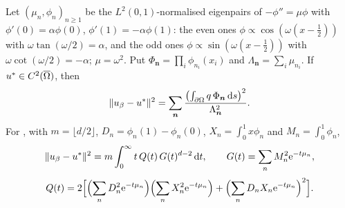 \begin{proposition}\label{sA_proofs:prop:exact}
Let $(\mu_n,\phi_n)_{n\ge1}$ be the $L^2(0,1)$-normalised eigenpairs of $-\phi''=\mu\phi$ with
$\phi'(0)=\alpha\phi(0)$, $\phi'(1)=-\alpha\phi(1)$: the even ones
$\phi\propto\cos(\omega(x-\frac12))$ with $\omega\tan(\omega/2)=\alpha$, and the odd ones
$\phi\propto\sin(\omega(x-\frac12))$ with $\omega\cot(\omega/2)=-\alpha$; $\mu=\omega^2$. Put
$\Phi_{\boldsymbol n}=\prod_i\phi_{n_i}(x_i)$ and $\Lambda_{\boldsymbol n}=\sum_i\mu_{n_i}$. If
$u^{*}\in C^2(\overline{\Omega})$, then
\[
\lVert u_{\beta}-u^{*}\rVert^2=\sum_{\boldsymbol n}\frac{\bigl(\int_{\partial\Omega}q\,\Phi_{\boldsymbol n}\,\mathrm{d} s\bigr)^2}{\Lambda_{\boldsymbol n}^2}.
\]
For \Pone, with $m=\lfloor d/2\rfloor$, $D_n=\phi_n(1)-\phi_n(0)$, $X_n=\int_0^1x\phi_n$ and
$M_n=\int_0^1\phi_n$,
\[
\lVert u_{\beta}-u^{*}\rVert^2=m\int_0^\infty t\,Q(t)\,G(t)^{d-2}\,\mathrm{d} t,\qquad G(t)=\sum_nM_n^2\mathrm{e}^{-t\mu_n},
\]
\[
Q(t)=2\Bigl[\Bigl(\sum_nD_n^2\mathrm{e}^{-t\mu_n}\Bigr)\Bigl(\sum_nX_n^2\mathrm{e}^{-t\mu_n}\Bigr)+\Bigl(\sum_nD_nX_n\mathrm{e}^{-t\mu_n}\Bigr)^2\Bigr].
\]
\end{proposition}
